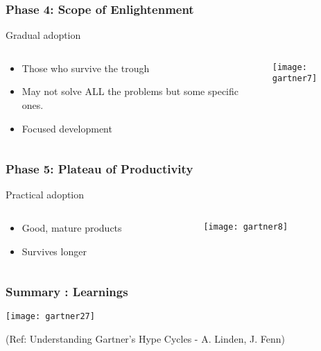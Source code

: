 \begin{frame}[fragile]\frametitle{Phase 4: Scope of Enlightenment}

Gradual adoption

 \begin{columns}
  \begin{column}{0.55\linewidth}
\begin{itemize}
\item Those who survive the trough
\item May not solve ALL the problems but some specific ones.
\item Focused development
\end{itemize}
  \end{column}%
  \begin{column}{0.45\linewidth}
			\begin{center}
			\texttt{[image: gartner7]}
			\end{center}
  \end{column}
 \end{columns}
 
\end{frame}


\begin{frame}[fragile]\frametitle{Phase 5: Plateau of Productivity}

Practical adoption


 \begin{columns}
  \begin{column}{0.55\linewidth}
\begin{itemize}
\item Good, mature products
\item Survives longer
\end{itemize}
  \end{column}%
  \begin{column}{0.45\linewidth}
			\begin{center}
			\texttt{[image: gartner8]}
			\end{center}
  \end{column}
 \end{columns}
 
\end{frame}

\begin{frame}[fragile]\frametitle{Summary : Learnings}

\begin{center}
\texttt{[image: gartner27]}
\end{center}

{\tiny (Ref: Understanding Gartner's Hype Cycles - A. Linden, J. Fenn)}
\end{frame}


